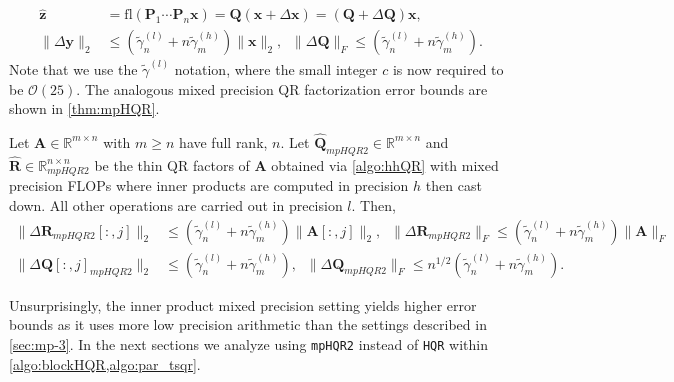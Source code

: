 \documentclass[review,onefignum,onetabnum]{siamart190516}
\newcommand{\R}{\mathbb{R}}
\newcommand{\bb}[1]{\mathbf{#1}}
\newcommand{\fl}{\mathrm{fl}}
\newcommand{\cO}{\mathcal{O}}
\begin{document}
\begin{align}
\hat{\bb{z}} &= \fl(\bb{P}_1\cdots\bb{P}_n\bb{x})=\bb{Q} (\bb{x} +\Delta \bb{x}) = (\bb{Q} + \Delta \bb{Q})\bb{x},\\
\|\Delta \bb{y}\|_2 &\leq (\tilde{\gamma}_n^{(l)}+n\tilde{\gamma}_m^{(h)})\|\bb{x}\|_2,\;\; \|\Delta \bb{Q}\|_F\leq (\tilde{\gamma}_n^{(l)}+n\tilde{\gamma}_m^{(h)}).\label{eqn:mp19.3}
\end{align} 
Note that we use the $\tilde{\gamma}^{(l)}$ notation, where the small integer $c$ is now required to be $\cO(25)$.
The analogous mixed precision QR factorization error bounds are shown in \cref{thm:mpHQR}.
\begin{theorem}
	\label{thm:mpHQR}
	Let $\bb{A}\in\R^{m\times n}$ with $m\geq n$ have full rank, $n$. 
	Let $\hat{\bb{Q}}_{mpHQR2}\in\R^{m\times n}$ and $\hat{\bb{R}}\in\R^{n\times n}_{mpHQR2}$ be the thin QR factors of $\bb{A}$ obtained via \cref{algo:hhQR} with mixed precision FLOPs where inner products are computed in precision $h$ then cast down.
	All other operations are carried out in precision $l$.
	Then,
	\begin{align}
	\|\Delta \bb{R}_{mpHQR2}[:,j]\|_2&\leq (\tilde{\gamma}_n^{(l)}+n\tilde{\gamma}_m^{(h)}) \|\bb{A}[:,j]\|_2,\;\; \|\Delta \bb{R}_{mpHQR2}\|_F\leq (\tilde{\gamma}_n^{(l)}+n\tilde{\gamma}_m^{(h)}) \|\bb{A}\|_F \label{eqn:mpHQR2R}\\
	\|\Delta \bb{Q}[:,j]_{mpHQR2}\|_2&\leq (\tilde{\gamma}_n^{(l)}+n\tilde{\gamma}_m^{(h)}),\;\; \|\Delta \bb{Q}_{mpHQR2}\|_F \leq n^{1/2} (\tilde{\gamma}_n^{(l)}+n\tilde{\gamma}_m^{(h)})\label{eqn:mpHQR2Q}.
	\end{align}
\end{theorem}
Unsurprisingly, the inner product mixed precision setting yields higher error bounds as it uses more low precision arithmetic than the settings described in \cref{sec:mp-3}. 
In the next sections we analyze using {\tt mpHQR2} instead of {\tt HQR} within \cref{algo:blockHQR,algo:par_tsqr}.
\end{document}
